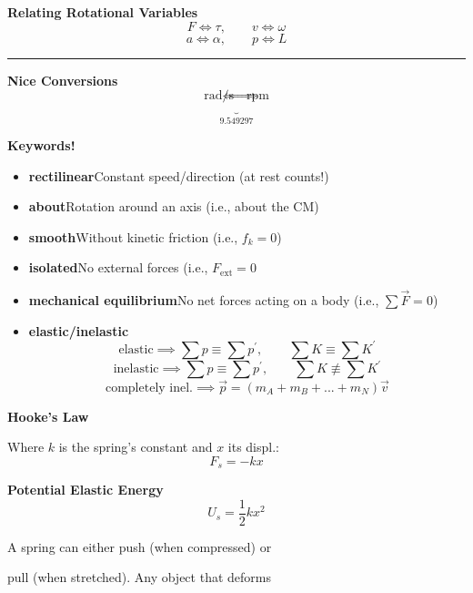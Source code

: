 \documentclass[	DIV=calc,%
							paper=a4,%
							fontsize=11pt,%
							twocolumn]{scrartcl} %
\newcommand{\hformbar}[1]{\vspace{5pt}\hrule\vspace{10pt}} %
\newcommand{\formdesc}[1]{\noindent\textbf{#1}}
\begin{document}
\textbf{Relating Rotational Variables}
    $$F\iff\tau,\qquad  v\iff\omega$$
    $$a\iff\alpha,\qquad p\iff L$$
\hformbar{}

\sethlcolor{pink}{\formdesc{\hl{Misc.}}}

\textbf{Nice Conversions}
\begin{equation}
    \underbrace{\text{rad/s}\iff\text{rpm}}_{9.549297}
\end{equation}

\textbf{Keywords!}
\begin{itemize}
    \item\textbf{rectilinear}\newline\qquad Constant speed/direction (at rest counts!)
    \item \textbf{about}\newline\qquad Rotation around an axis (i.e., about the CM)
    \item \textbf{smooth}\newline\qquad Without kinetic friction (i.e., $f_k=0$)
    \item \textbf{isolated}\newline\qquad No external forces (i.e., $F_\text{ext}=0$
    \item \textbf{mechanical equilibrium}\newline\qquad No net forces acting on a body (i.e., $\sum\vec F=0$)
    \item \textbf{elastic/inelastic}\newline\qquad $$\text{elastic}\implies\sum p\equiv\sum p^\prime,\qquad\sum K\equiv\sum K^\prime$$
    $$\text{inelastic}\implies\sum p\equiv\sum p^\prime,\qquad\sum K\not\equiv\sum K^\prime$$
    $$\text{completely inel.}\implies\vec p=(m_A+m_B+...+m_N)\vec v$$
\end{itemize}

\textbf{Hooke's Law}

Where $k$ is the spring's constant and $x$ its displ.:
\begin{equation}
    F_s = -kx
\end{equation}

\textbf{Potential Elastic Energy}
\begin{equation}
    U_s=\frac{1}{2}kx^2
\end{equation}

A spring can either push (when compressed) or 

pull (when stretched). Any object that deforms 
\end{document}
